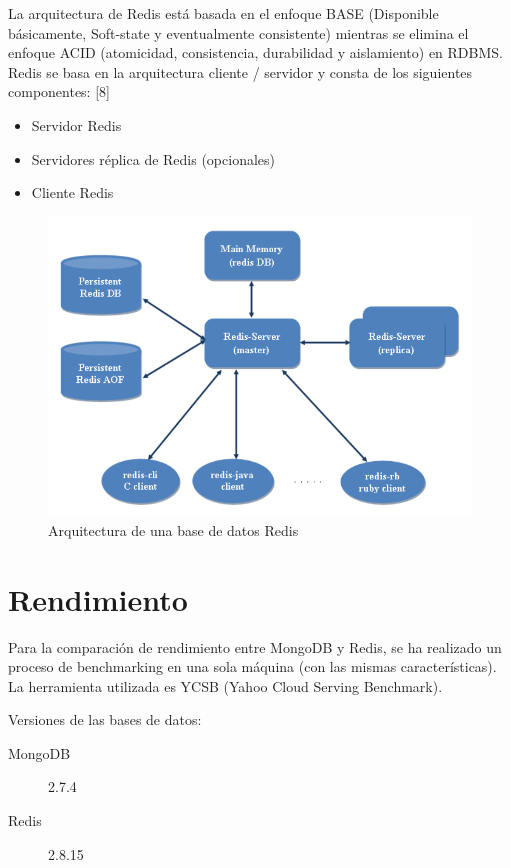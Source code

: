 \documentclass[twocolumn]{article}
\begin{document}
La arquitectura de Redis está basada en el enfoque BASE (Disponible básicamente, Soft-state y eventualmente consistente) mientras se elimina el enfoque ACID (atomicidad, consistencia, durabilidad y aislamiento) en RDBMS. Redis se basa en la arquitectura cliente / servidor y consta de los siguientes componentes: [8]

\begin{itemize}
  \item Servidor Redis
  \item Servidores réplica de Redis (opcionales)
  \item Cliente Redis
\end{itemize}

\begin{figure}[h]
  \includegraphics[width = \columnwidth]{img/02_redis.png}
  \caption{Arquitectura de una base de datos Redis}
\end{figure}

\section{Rendimiento}

Para la comparación de rendimiento entre MongoDB y Redis, se ha realizado un proceso de benchmarking en una sola máquina (con las mismas características). La herramienta utilizada es YCSB (Yahoo Cloud Serving Benchmark).

Versiones de las bases de datos:

\begin{description}
  \item[MongoDB] 2.7.4
  \item[Redis] 2.8.15
\end{description}
\end{document}
